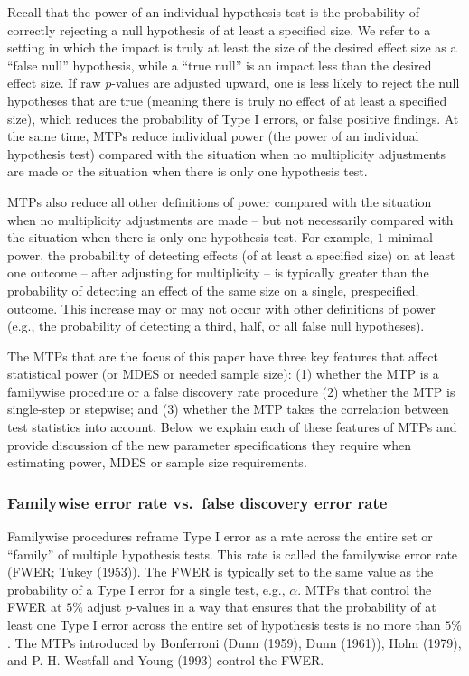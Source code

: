 \documentclass[
]{article}
\begin{document}
Recall that the power of an individual hypothesis test is the
probability of correctly rejecting a null hypothesis of at least a
specified size. We refer to a setting in which the impact is truly at
least the size of the desired effect size as a ``false null''
hypothesis, while a ``true null'' is an impact less than the desired
effect size. If raw \(p\)-values are adjusted upward, one is less likely
to reject the null hypotheses that are true (meaning there is truly no
effect of at least a specified size), which reduces the probability of
Type I errors, or false positive findings. At the same time, MTPs reduce
individual power (the power of an individual hypothesis test) compared
with the situation when no multiplicity adjustments are made or the
situation when there is only one hypothesis test.

MTPs also reduce all other definitions of power compared with the
situation when no multiplicity adjustments are made -- but not
necessarily compared with the situation when there is only one
hypothesis test. For example, \(1\)-minimal power, the probability of
detecting effects (of at least a specified size) on at least one outcome
-- after adjusting for multiplicity -- is typically greater than the
probability of detecting an effect of the same size on a single,
prespecified, outcome. This increase may or may not occur with other
definitions of power (e.g., the probability of detecting a third, half,
or all false null hypotheses).

The MTPs that are the focus of this paper have three key features that
affect statistical power (or MDES or needed sample size): (1) whether
the MTP is a familywise procedure or a false discovery rate procedure
(2) whether the MTP is single-step or stepwise; and (3) whether the MTP
takes the correlation between test statistics into account. Below we
explain each of these features of MTPs and provide discussion of the new
parameter specifications they require when estimating power, MDES or
sample size requirements.

\hypertarget{familywise-error-rate-vs.-false-discovery-error-rate}{%
\subsubsection{Familywise error rate vs.~false discovery error
rate}\label{familywise-error-rate-vs.-false-discovery-error-rate}}

Familywise procedures reframe Type I error as a rate across the entire
set or ``family'' of multiple hypothesis tests. This rate is called the
familywise error rate (FWER; Tukey (1953)). The FWER is typically set to
the same value as the probability of a Type I error for a single test,
e.g., \(\alpha\). MTPs that control the FWER at \(5\%\) adjust
\(p\)-values in a way that ensures that the probability of at least one
Type I error across the entire set of hypothesis tests is no more than
\(5\%\). The MTPs introduced by Bonferroni (Dunn (1959), Dunn (1961)),
Holm (1979), and P. H. Westfall and Young (1993) control the FWER.
\end{document}
